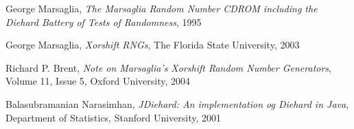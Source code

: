 \begin{thebibliography}{10}

	George Marsaglia,
	\emph{The Marsaglia Random Number CDROM including the Diehard Battery of Tests of Randomness},
	1995
	
	George Marsaglia,
	\emph{Xorshift RNGs},
	The Florida State University,
	2003

	Richard P. Brent,
	\emph{Note on Marsaglia’s Xorshift Random Number Generators},
	Volume 11,
	Issue 5,
	Oxford University,
	2004

	Balasubramanian Narasimhan,
	\emph{JDiehard: An implementation og Diehard in Java},
	Department of Statistics,
	Stanford University,
	2001

\end{thebibliography}
